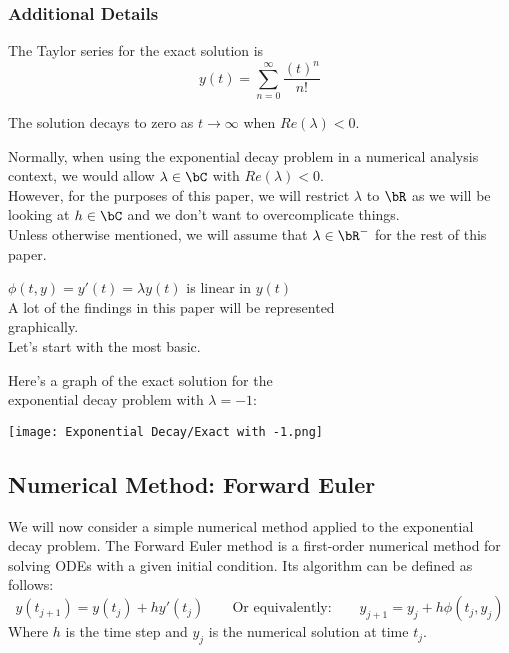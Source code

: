 \subsubsection{Additional Details}
\begin{multicols}{2}
The Taylor series for the exact solution is 
\[y(t) = \sum\limits_{n=0}^{\infty} \frac{{(t)}^n}{n!}\]

The solution decays to zero as $t \rightarrow \infty$ when $Re(\lambda) < 0$.\\

\par Normally, when using the exponential decay problem in a numerical analysis context, we would allow $\lambda \in \bC$ with $Re(\lambda)<0$.\\
However, for the purposes of this paper, we will restrict $\lambda$ to $\bR$ as we will be looking at $h \in \bC$ and we don't want to overcomplicate things.\\
Unless otherwise mentioned, we will assume that $\lambda \in \bR^{-}$ for the rest of this paper.\\

\par $\phi(t, y) = y'(t) = \lambda y(t)$ is linear in $y(t)$\\

\columnbreak{}
\hspace*{0.75cm}
A lot of the findings in this paper will be represented\\
\hspace*{0.75cm}
graphically.\\
\hspace*{0.75cm}
Let's start with the most basic.\\
\par \hspace*{0.75cm}
Here's a graph of the exact solution for the\\ 
\hspace*{0.75cm}
exponential decay problem with $\lambda = -1$:
\begin{center}
\texttt{[image: Exponential Decay/Exact with -1.png]}
\end{center}
\end{multicols}

\newpage
\subsection{Numerical Method: Forward Euler}

\par We will now consider a simple numerical method applied to the exponential decay problem.
The Forward Euler method is a first-order numerical method for solving ODEs with a given initial condition.
Its algorithm can be defined as follows:
\[ y(t_{j+1}) = y(t_j) + h y'(t_j) \qquad \text{Or equivalently:} \qquad y_{j+1} = y_j + h \phi(t_j, y_j)\]
Where $h$ is the time step and $y_j$ is the numerical solution at time $t_j$.

